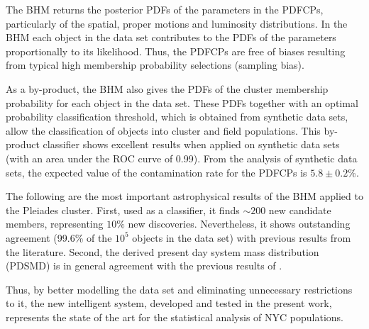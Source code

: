 The BHM returns the posterior PDFs of the parameters in the PDFCPs, particularly of the spatial, proper motions and luminosity distributions. In the BHM each object in the data set contributes to the PDFs of the parameters proportionally to its likelihood. Thus, the PDFCPs are free of biases resulting from typical high membership probability selections (sampling bias).

As a by-product, the BHM also gives the PDFs of the cluster membership probability for each object in the data set. These PDFs together with an optimal probability classification threshold, which is obtained from synthetic data sets, allow the classification of objects into cluster and field populations. This by-product classifier shows excellent results when applied on synthetic data sets (with an area under the ROC curve of 0.99). From the analysis of synthetic data sets, the expected value of the contamination rate for the PDFCPs is $5.8\pm 0.2$\%. 

The following are the most important astrophysical results of the BHM applied to the Pleiades cluster. First, used as a classifier, it finds $\sim 200$ new candidate members, representing $10\%$ new discoveries. Nevertheless, it shows outstanding agreement (99.6\% of the $10^5$ objects in the data set) with previous results from the literature. Second, the derived present day system mass distribution (PDSMD) is in general agreement with the previous results of \citet{Bouy2015}. 

Thus, by better modelling the data set and eliminating unnecessary restrictions to it, the new intelligent system, developed and tested in the present work, represents the state of the art for the statistical analysis of NYC populations.



 






